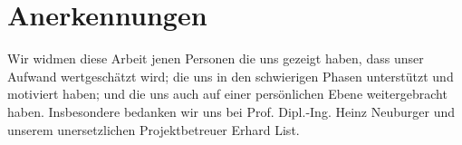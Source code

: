 \section*{Anerkennungen}

Wir widmen diese Arbeit jenen Personen die uns gezeigt haben, dass unser Aufwand wertgeschätzt wird; die uns in den schwierigen Phasen unterstützt und motiviert haben; und die uns auch auf einer persönlichen Ebene weitergebracht haben. Insbesondere bedanken wir uns bei Prof. Dipl.-Ing. Heinz Neuburger und unserem unersetzlichen Projektbetreuer Erhard List.